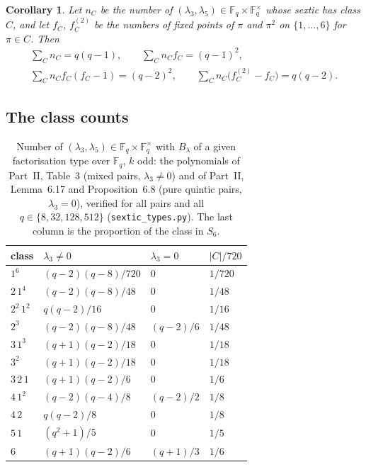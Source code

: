 ﻿\documentclass[12pt,a4paper]{amsart}
\newtheorem{corollary}[theorem]{Corollary}
\theoremstyle{definition}
\newcommand{\F}{\mathbb{F}}
\begin{document}
\begin{corollary}\label{cor:relations}
Let $n_C$ be the number of $(\lambda_3,\lambda_5)\in\F_q\times\F_q^\times$ whose sextic has class $C$, and let $f_C$, $f_C^{(2)}$ be the numbers of fixed points of $\pi$ and $\pi^2$ on $\{1,\dots,6\}$ for $\pi\in C$. Then
\begin{gather*}
\sum_Cn_C=q(q-1),\qquad \sum_Cn_Cf_C=(q-1)^2,\\
\sum_Cn_Cf_C(f_C-1)=(q-2)^2,\qquad \sum_Cn_C\bigl(f_C^{(2)}-f_C\bigr)=q(q-2).
\end{gather*}
\end{corollary}

\subsection{The class counts}
\begin{table}[H]
\centering
\caption{Number of $(\lambda_3,\lambda_5)\in\F_q\times\F_q^\times$ with $B_\lambda$ of a given factorisation type over $\F_q$, $k$ odd: the polynomials of Part~II, Table~3 (mixed pairs, $\lambda_3\ne0$) and of Part~II, Lemma~6.17 and Proposition~6.8 (pure quintic pairs, $\lambda_3=0$), verified for all pairs and all $q\in\{8,32,128,512\}$ (\texttt{sextic\_types.py}). The last column is the proportion of the class in $S_6$.}\label{tab:counts}
\small
\begin{tabular}{@{}llll@{}}
\toprule
class & $\lambda_3\ne0$ & $\lambda_3=0$ & $|C|/720$\\
\midrule
$1^6$ & $(q-2)(q-8)/720$ & $0$ & $1/720$\\
$2\,1^4$ & $(q-2)(q-8)/48$ & $0$ & $1/48$\\
$2^2\,1^2$ & $q(q-2)/16$ & $0$ & $1/16$\\
$2^3$ & $(q-2)(q-8)/48$ & $(q-2)/6$ & $1/48$\\
$3\,1^3$ & $(q+1)(q-2)/18$ & $0$ & $1/18$\\
$3^2$ & $(q+1)(q-2)/18$ & $0$ & $1/18$\\
$3\,2\,1$ & $(q+1)(q-2)/6$ & $0$ & $1/6$\\
$4\,1^2$ & $(q-2)(q-4)/8$ & $(q-2)/2$ & $1/8$\\
$4\,2$ & $q(q-2)/8$ & $0$ & $1/8$\\
$5\,1$ & $(q^2+1)/5$ & $0$ & $1/5$\\
$6$ & $(q+1)(q-2)/6$ & $(q+1)/3$ & $1/6$\\
\bottomrule
\end{tabular}
\end{table}
\end{document}
